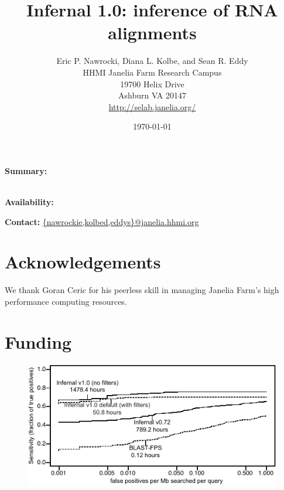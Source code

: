 \documentclass[11pt]{article}
\begin{document}
\title{Infernal 1.0: inference of RNA alignments}
\author{Eric P. Nawrocki, Diana L. Kolbe, and Sean R. Eddy\\
HHMI Janelia Farm Research Campus\\
19700 Helix Drive\\
Ashburn VA 20147\\
\url{http://selab.janelia.org/}\\
}
\date{\today}
\maketitle

\textbf{Summary:}

\\
\textbf{Availability:}


\textbf{Contact:} \url{{nawrockie,kolbed,eddys}@janelia.hhmi.org}






\section{Acknowledgements}
We thank Goran Ceric for his peerless skill in managing Janelia Farm's
high performance computing resources.

\section{Funding}





\newpage

\begin{figure}
\begin{center}
\includegraphics[width=6.4in]{figs/roc-short}

\label{Fig:roc}
\end{center}
\end{figure}

\end{document}
